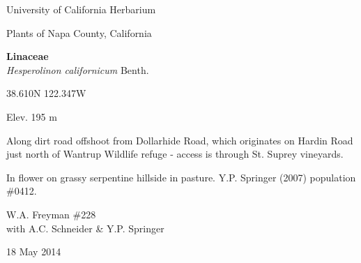 \documentclass[letterpaper,10pt]{article}
\begin{document}
\begin{minipage}[t]{0.40\textwidth}

\begin{center}
University of California Herbarium \\
\begin{large}
Plants of Napa County, California \\
\end{large}
\vspace{\baselineskip}
\textbf{Linaceae} \\
\textit{Hesperolinon californicum} Benth.\\
\end{center}

\begin{footnotesize}

\begin{multicols}{2}
38.610\textdegree N 122.347\textdegree W
\columnbreak
\begin{flushright}
Elev. 195 m
\end{flushright}
\end{multicols}

Along dirt road offshoot from Dollarhide Road, which originates on Hardin Road just north of Wantrup Wildlife refuge - access is through St. Suprey vineyards.
\vspace{\baselineskip}

In flower on grassy serpentine hillside in pasture. Y.P. Springer (2007) population \#0412.

\begin{multicols}{2}
W.A. Freyman \#228 \\
with A.C. Schneider \& Y.P. Springer
\columnbreak
\begin{flushright}
18 May 2014
\end{flushright}
\end{multicols}

\end{footnotesize}

\end{minipage}
%
\hspace{2cm}
%
\end{document}
